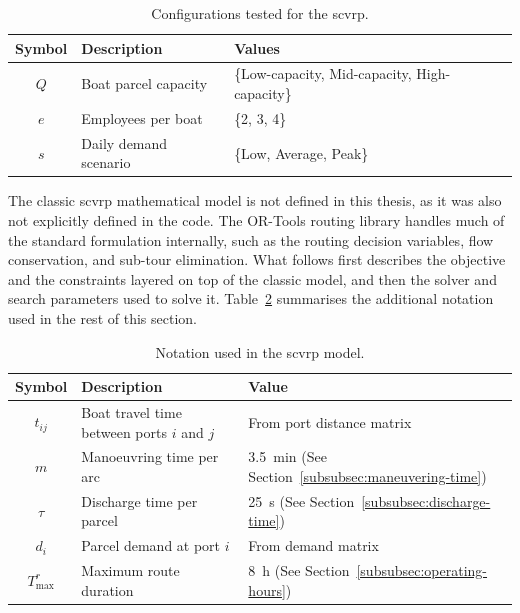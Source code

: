 \documentclass[12pt]{article}
\begin{document}
\begin{table}[htbp]
  \centering
  \caption{Configurations tested for the \ac{scvrp}.}
  \label{tab:cvrp_configs}

  \begin{tabularx}{\textwidth}{c >{\raggedright\arraybackslash}X l}
    \toprule
    \textbf{Symbol} & \textbf{Description}  & \textbf{Values}                               \\
    \midrule
    \(Q\)           & Boat parcel capacity  & \{Low-capacity, Mid-capacity, High-capacity\} \\
    \(e\)           & Employees per boat    & \{2, 3, 4\}                                   \\
    \(s\)           & Daily demand scenario & \{Low, Average, Peak\}                        \\
    \bottomrule
  \end{tabularx}
\end{table}

The classic \ac{scvrp} mathematical model is not defined in this thesis, as it was also not explicitly defined in the code. The OR-Tools routing library \parencite{ortools} handles much of the standard formulation internally, such as the routing decision variables, flow conservation, and sub-tour elimination. What follows first describes the objective and the constraints layered on top of the classic model, and then the solver and search parameters used to solve it. Table~\ref{tab:scvrp_notation} summarises the additional notation used in the rest of this section.

\begin{table}[htbp]
  \centering
  \caption{Notation used in the \ac{scvrp} model.}
  \label{tab:scvrp_notation}

  \begin{tabularx}{\textwidth}{c X l}
    \toprule
    \textbf{Symbol}  & \textbf{Description}                           & \textbf{Value}                                                    \\
    \midrule
    \(t_{ij}\)       & Boat travel time between ports \(i\) and \(j\) & From port distance matrix                                         \\
    \(m\)            & Manoeuvring time per arc                       & \qty{3.5}{\minute} (See Section~\ref{subsubsec:maneuvering-time}) \\
    \(\tau\)         & Discharge time per parcel                      & \qty{25}{\second}  (See Section~\ref{subsubsec:discharge-time})   \\
    \(d_i\)          & Parcel demand at port \(i\)                    & From demand matrix                                                \\
    \(T^{r}_{\max}\) & Maximum route duration                         & \qty{8}{\hour}  (See Section~\ref{subsubsec:operating-hours})     \\
    \bottomrule
  \end{tabularx}
\end{table}
\end{document}
